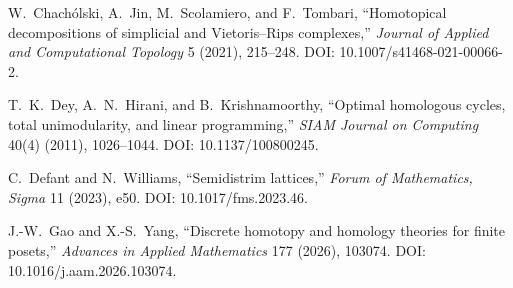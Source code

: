 
W.~Chach\'olski, A.~Jin, M.~Scolamiero, and F.~Tombari,
``Homotopical decompositions of simplicial and Vietoris--Rips complexes,''
\emph{Journal of Applied and Computational Topology} 5 (2021), 215--248.
DOI: 10.1007/s41468-021-00066-2.

T.~K.~Dey, A.~N.~Hirani, and B.~Krishnamoorthy,
``Optimal homologous cycles, total unimodularity, and linear programming,''
\emph{SIAM Journal on Computing} 40(4) (2011), 1026--1044.
DOI: 10.1137/100800245.

C.~Defant and N.~Williams,
``Semidistrim lattices,''
\emph{Forum of Mathematics, Sigma} 11 (2023), e50.
DOI: 10.1017/fms.2023.46.

J.-W.~Gao and X.-S.~Yang,
``Discrete homotopy and homology theories for finite posets,''
\emph{Advances in Applied Mathematics} 177 (2026), 103074.
DOI: 10.1016/j.aam.2026.103074.

